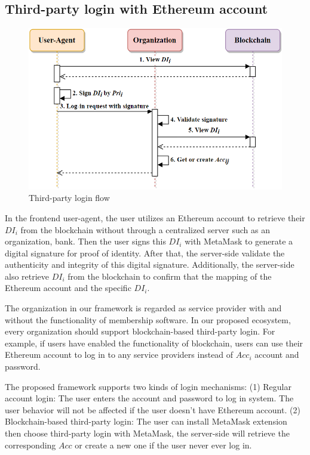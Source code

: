     \subsection{Third-party login with Ethereum account}
    \begin{figure}[htb]
        \centering
        \includegraphics[height=!,width=0.8\linewidth,keepaspectratio=true]{figures/Third_party_login.png}
        \caption{{\footnotesize Third-party login flow}}
        \label{fig:thirdPartyLogin}
    \end{figure}

    In the frontend user-agent, the user utilizes an Ethereum account to retrieve their \(DI_i\) from the blockchain without through a centralized server such as an organization, bank. Then the user signs this \(DI_i\) with MetaMask to generate a digital signature for proof of identity. After that, the server-side validate the authenticity and integrity of this digital signature. Additionally, the server-side also retrieve \(DI_i\) from the blockchain to confirm that the mapping of the Ethereum account and the specific \(DI_i\).
    \par
    The organization in our framework is regarded as service provider with and without the functionality of membership software. In our proposed ecosystem, every organization should support blockchain-based third-party login. For example, if users have enabled the functionality of blockchain, users can use their Ethereum account to log in to any service providers instead of \(Acc_i\) account and password.
    \par 
    The proposed framework supports two kinds of login mechanisms: (1) Regular account login: The user enters the account and password to log in system. The user behavior will not be affected if the user doesn't have Ethereum account. (2) Blockchain-based third-party login: The user can install MetaMask extension then choose third-party login with MetaMask, the server-side will retrieve the corresponding \(Acc\) or create a new one if the user never ever log in.
      
